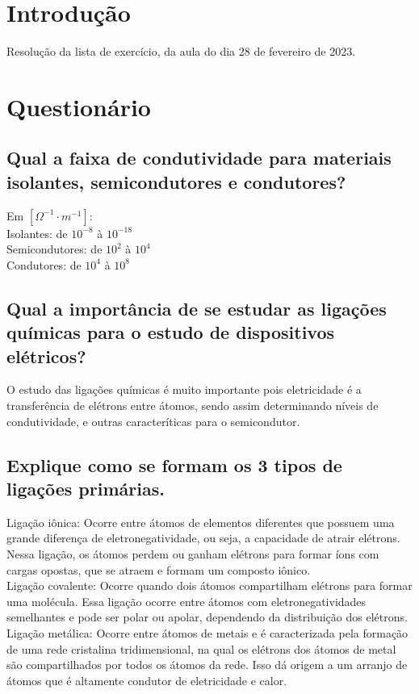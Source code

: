 
\section{Introdução}
Resolução da lista de exercício, da aula do dia 28 de fevereiro de 2023.

\section{Questionário}

\subsection{Qual a faixa de condutividade para materiais isolantes, semicondutores e condutores?}
Em $\left[\Omega^{-1}\cdot m^{-1}\right]$:\\
Isolantes: de $10^{-8}$ à $10^{-18}$\\
Semicondutores: de $10^{2}$ à $10^{4}$\\
Condutores: de $10^{4}$ à $10^{8}$
\subsection{Qual a importância de se estudar as ligações químicas para o estudo de dispositivos elétricos?}
O estudo das ligações químicas é muito importante pois eletricidade é a transferência de elétrons entre átomos, sendo assim determinando níveis de condutividade, e outras caracteríticas para o semicondutor.
\subsection{Explique como se formam os 3 tipos de ligações primárias.}
Ligação iônica: Ocorre entre átomos de elementos diferentes que possuem uma grande diferença de eletronegatividade, ou seja, a capacidade de atrair elétrons. Nessa ligação, os átomos perdem ou ganham elétrons para formar íons com cargas opostas, que se atraem e formam um composto iônico.\\
Ligação covalente: Ocorre quando dois átomos compartilham elétrons para formar uma molécula. Essa ligação ocorre entre átomos com eletronegatividades semelhantes e pode ser polar ou apolar, dependendo da distribuição dos elétrons.\\
Ligação metálica: Ocorre entre átomos de metais e é caracterizada pela formação de uma rede cristalina tridimensional, na qual os elétrons dos átomos de metal são compartilhados por todos os átomos da rede. Isso dá origem a um arranjo de átomos que é altamente condutor de eletricidade e calor.
